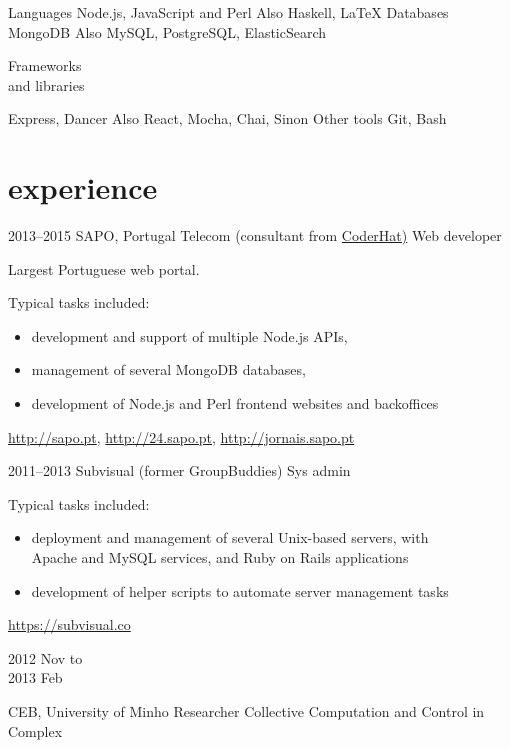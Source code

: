 \documentclass[a4paper]{friggeri-cv}
\begin{document}
\begin{entrylist}
    \entry
        {Languages}
        {Node.js, JavaScript and Perl}
        {}
        {\small Also Haskell, \LaTeX}
    \entry
        {Databases}
        {MongoDB}
        {}
        {\small Also MySQL, PostgreSQL, ElasticSearch}
    \entry
    {\parbox[t][][t]{2.3cm}{Frameworks\\{\small and libraries}}}
        {Express, Dancer}
        {}
        {\small Also React, Mocha, Chai, Sinon}
    \entry
        {Other tools}
        {Git, Bash}
        {}
        {}
\end{entrylist}

\section{experience}
\begin{entrylist}
  \entry
    {2013--2015}
    {SAPO, Portugal Telecom (consultant from \href{http://www.coderhat.com/}{CoderHat)}}
    {Web developer}
    {Largest Portuguese web portal. \footnotesize{Typical tasks included:
        \begin{itemize}
            \item development and support of multiple Node.js APIs,
            \item management of several MongoDB databases,
            \item development of Node.js and Perl frontend websites and backoffices
        \end{itemize}
        \url{http://sapo.pt}, \url{http://24.sapo.pt}, \url{http://jornais.sapo.pt}
        }
    }
  \entry
    {2011--2013}
    {Subvisual (former GroupBuddies)}
    {Sys admin}
    {
    \footnotesize{Typical tasks included:
        \begin{itemize}
            \item deployment and management of several Unix-based
            servers, with\\
            Apache and MySQL services, and Ruby on Rails applications
            \item development of helper scripts to automate
            server management tasks
            \end{itemize}
        \url{https://subvisual.co}
        }
    }
  \entry
    {\parbox[t][][t]{1.8cm}{2012 {\footnotesize Nov to}\\2013 {\footnotesize Feb}}}
    {CEB, University of Minho}
    {Researcher}
    {Collective Computation and Control in Complex\\
}
\end{entrylist}
\end{document}
